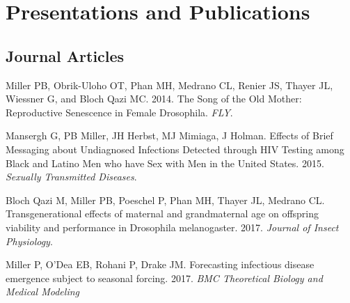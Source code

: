 \documentclass[letterpaper]{article}
\renewenvironment{itemize}{
  \begin{list}{}{
    \setlength{\leftmargin}{1.5em}
  }
}{
  \end{list}
}
\begin{document}
\section*{Presentations and Publications}

\subsection*{Journal Articles}

\begin{itemize}
\item Miller PB, Obrik-Uloho OT, Phan MH, Medrano CL, Renier JS, Thayer JL, Wiessner G, and Bloch Qazi MC. 2014. The Song of the Old Mother: Reproductive Senescence in Female Drosophila. \textit{FLY}.
\item Mansergh G, PB Miller, JH Herbst, MJ Mimiaga, J Holman. Effects of Brief Messaging about Undiagnosed Infections Detected through HIV Testing among Black and Latino Men who have Sex with Men in the United States. 2015. \textit{Sexually Transmitted Diseases}.
\item Bloch Qazi M, Miller PB, Poeschel P, Phan MH, Thayer JL, Medrano CL. Transgenerational effects of maternal and grandmaternal age on offspring viability and performance in Drosophila melanogaster. 2017. \textit{Journal of Insect Physiology}.
\item Miller P, O'Dea EB, Rohani P, Drake JM. Forecasting infectious disease emergence subject to seasonal forcing. 2017. \textit{BMC Theoretical Biology and Medical Modeling}
\end{itemize}
\end{document}
